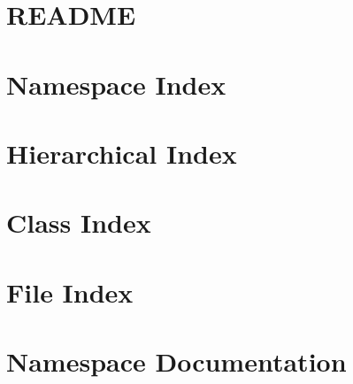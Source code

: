 \let\mypdfximage\pdfximage\def\pdfximage{\immediate\mypdfximage}\documentclass[twoside]{book}
\newcommand{\+}{\discretionary{\mbox{\scriptsize$\hookleftarrow$}}{}{}}
\begin{document}
\chapter{R\+E\+A\+D\+ME}
\label{md_vision_yolov5_utils_loggers_comet_README}

\chapter{Namespace Index}

\chapter{Hierarchical Index}

\chapter{Class Index}

\chapter{File Index}

\chapter{Namespace Documentation}






















































\end{document}
